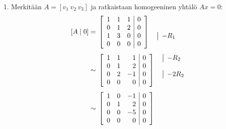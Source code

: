 \documentclass[11pt,a4paper]{amsart}
\begin{document}
\begin{solution}
  \leavevmode\par
  \begin{enumerate}[label=(\alph*), leftmargin=*]
    \item Merkitään \(A=[v_1\ v_2\ v_3]\) ja ratkaistaan
      homogeeninen yhtälö \(Ax=0\):
      \[
        \begin{aligned}
          [A\mid 0] &={}
          \left[
            \begin{array}{rrr|r}
              1 & 1 & 1 & 0 \\
              0 & 1 & 2 & 0 \\
              1 & 3 & 0 & 0 \\
              0 & 0 & 0 & 0
            \end{array}
          \right]
          \quad
          \begin{array}{@{}l@{}}
            {} \\
            {} \\
            \smash{\rowop{-R_1}} \\
            {}
          \end{array}
          \\[1ex]
          &\sim{}
          \left[
            \begin{array}{rrr|r}
              1 & 1 & 1 & 0 \\
              0 & 1 & 2 & 0 \\
              0 & 2 & -1 & 0 \\
              0 & 0 & 0 & 0
            \end{array}
          \right]
          \quad
          \begin{array}{@{}l@{}}
            \smash{\rowop{-R_2}} \\
            {} \\
            \smash{\rowop{-2R_2}} \\
            {}
          \end{array}
          \\[1ex]
          &\sim{}
          \left[
            \begin{array}{rrr|r}
              1 & 0 & -1 & 0 \\
              0 & 1 & 2 & 0 \\
              0 & 0 & -5 & 0 \\
              0 & 0 & 0 & 0
            \end{array}
          \right]
          \quad
          \begin{array}{@{}l@{}}

\end{array}
\end{aligned}\]
\end{enumerate}
\end{solution}
\end{document}
